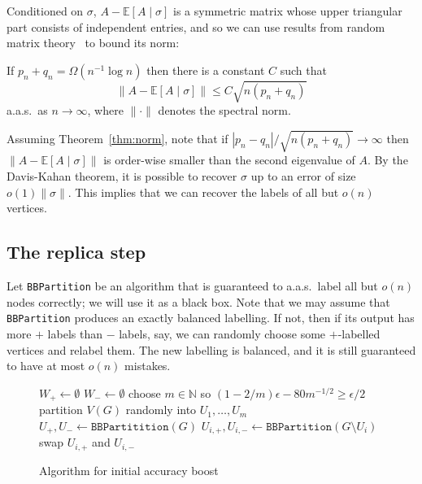 \documentclass[EJP,final]{ejpecp}
\newcommand{\N}{\mathbb{N}}
\newcommand{\E}{\mathbb{E}}
\newcommand{\1}[1]{\mathbbm{1}_{\{#1\}}}
\newcommand{\symdiff}{\Delta}
\begin{document}
Conditioned on $\sigma$, $A - \E[A \mid \sigma]$ is a
symmetric matrix whose upper triangular part consists of independent entries, and so we can use results from random matrix
theory~\cite{Vu:07,Seginer:00} to bound its norm:
\begin{theorem}\label{thm:norm}
 If $p_n + q_n = \Omega(n^{-1} \log n)$ then there is a constant $C$ such that
 \[
  \|A - \E[A \mid \sigma]\| \le C \sqrt{n (p_n + q_n)}
 \]
 a.a.s.\ as $n \to \infty$, where $\|\cdot\|$ denotes the spectral
 norm.
\end{theorem}

Assuming Theorem~\ref{thm:norm}, note that if
$|p_n - q_n|/\sqrt{n (p_n + q_n)} \to \infty$ then $\|A - \E[A \mid \sigma]\|$ is order-wise
smaller than the second eigenvalue of $A$. By the Davis-Kahan theorem, it is possible to
recover $\sigma$ up to an error of size $o(1) \|\sigma\|$. This implies that we can recover the labels
of all but $o(n)$ vertices.

\subsection{The replica step}\label{sec:first-step}

Let {\tt BBPartition} be an algorithm that is guaranteed to a.a.s.\ label all but $o(n)$ nodes correctly;
we will use it as a black box.
Note that we may assume that {\tt BBPartition} produces an exactly
balanced labelling. If not, then if its output has more $+$ labels
than $-$ labels, say, we can randomly choose some $+$-labelled vertices
and relabel them. The new labelling is balanced, and it is
still guaranteed to have at most $o(n)$ mistakes.

\begin{figure}
\begin{algorithm}[H]
 \LinesNumbered

 \BlankLine

 $W_+ \leftarrow \emptyset$\;
 $W_- \leftarrow \emptyset$\;
 choose $m \in \N$ so $(1-2/m) \epsilon - 80 m^{-1/2} \ge \epsilon/2$\;
 partition $V(G)$ randomly into $U_1, \dots, U_m$\;
 $U_+, U_- \leftarrow \mathtt{BBPartitition}(G)$\;
 \label{alg:first-initial-partition}
  {
  $U_{i,+}, U_{i,-} \leftarrow \mathtt{BBPartition}(G \setminus U_i)$\;
    \If{$|U_{i,+} \symdiff U_+| \ge n/2$ \label{alg:first-before-align}}
     {swap $U_{i,+}$ and $U_{i,-}$\; \label{alg:first-align} }
 }
\caption{Algorithm for initial accuracy boost}
\label{alg:first}
\end{algorithm}
\end{figure}
\end{document}

